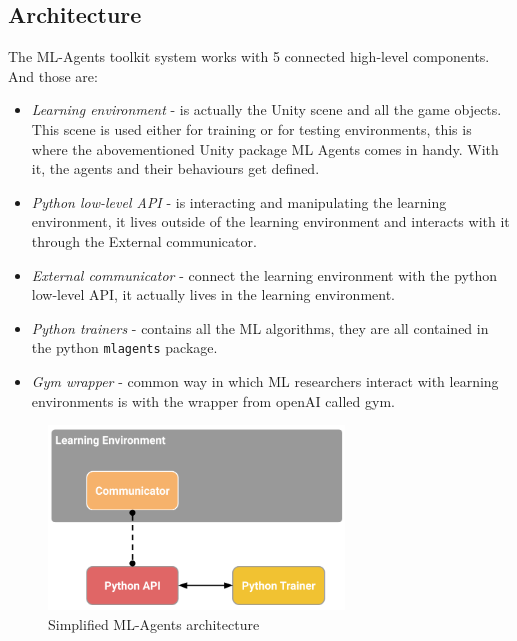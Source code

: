 \documentclass[a4paper, 12pt]{book}
\begin{document}
\subsection{Architecture}

The ML-Agents toolkit system works with 5 connected high-level components. And those are:

\begin{itemize}
    \item \emph{Learning environment} - is actually the Unity scene and all the game objects. This scene is used either for training or for testing environments, this is where the abovementioned Unity package ML Agents comes in handy. With it, the agents and their behaviours get defined.
    \item \emph{Python low-level API} - is interacting and manipulating the learning environment, it lives outside of the learning environment and interacts with it through the External communicator.
    \item \emph{External communicator} - connect the learning environment with the python low-level API, it actually lives in the learning environment.
    \item \emph{Python trainers} - contains all the ML algorithms, they are all contained in the python \texttt{mlagents} package.
    \item \emph{Gym wrapper} - common way in which ML researchers interact with learning environments is with the wrapper from openAI called gym.
\end{itemize}

\begin{figure}[h]
\begin{center}
\includegraphics[width=0.7\textwidth]{Images/learning_environment_basic.png}
\end{center}
\caption{Simplified ML-Agents architecture \cite{MLAgents}}
\label{pic6}
\end{figure}
\end{document}
